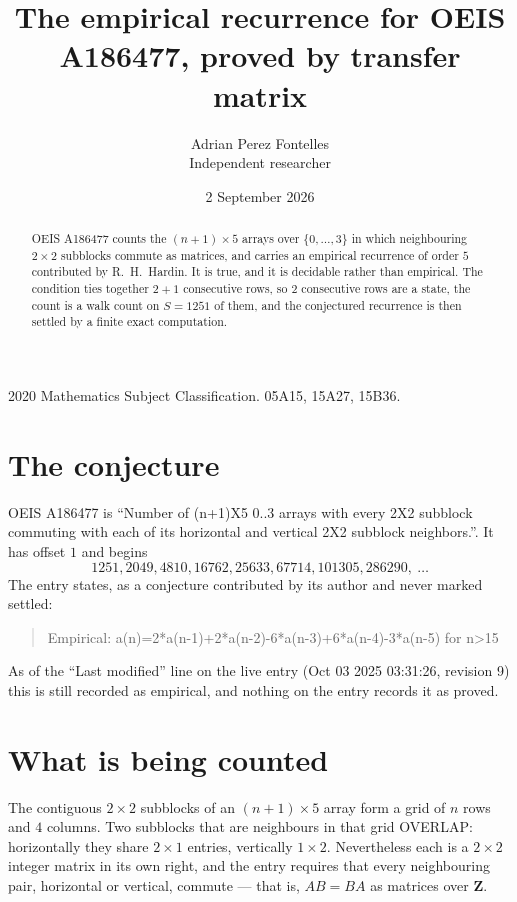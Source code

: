 \documentclass[11pt,a4paper]{article}
\title{The empirical recurrence for OEIS A186477, proved by transfer matrix}
\author{Adrian Perez Fontelles\\ \small Independent researcher}
\date{2 September 2026}
\theoremstyle{plain}
\theoremstyle{definition}
\begin{document}
\maketitle

\begin{abstract}
OEIS A186477 counts the $(n+1)\times5$ arrays over $\{0,\dots,3\}$ in which
neighbouring $2\times2$ subblocks commute as matrices, and carries an empirical recurrence
of order $5$ contributed by R.~H.~Hardin. It is true, and it is decidable rather than
empirical. The condition ties together $2+1$ consecutive rows, so $2$ consecutive rows are
a state, the count is a walk count on $S=1251$ of them, and the conjectured recurrence is then
settled by a finite exact computation.
\end{abstract}

\noindent\small 2020 Mathematics Subject Classification. 05A15, 15A27, 15B36.\normalsize

\section{The conjecture}

OEIS A186477 is ``Number of (n+1)X5 0..3 arrays with every 2X2 subblock commuting with each of its horizontal and vertical 2X2 subblock neighbors.''. It has offset $1$ and begins
\[
1251, 2049, 4810, 16762, 25633, 67714, 101305, 286290,\ \dots
\]
The entry states, as a conjecture contributed by its author and never marked settled:
\begin{quote}
Empirical: a(n)=2*a(n-1)+2*a(n-2)-6*a(n-3)+6*a(n-4)-3*a(n-5) for n>15
\end{quote}
As of the ``Last modified'' line on the live entry (Oct 03 2025 03:31:26, revision 9) this is still
recorded as empirical, and nothing on the entry records it as proved.

\section{What is being counted}

The contiguous $2\times2$ subblocks of an $(n+1)\times5$ array form a grid of $n$
rows and $4$ columns. Two subblocks that are neighbours in that
grid OVERLAP: horizontally they share $2\times1$ entries, vertically
$1\times2$. Nevertheless each is a $2\times2$ integer matrix in its own right, and
the entry requires that every neighbouring pair, horizontal or vertical, commute --- that is,
$AB=BA$ as matrices over $\mathbf{Z}$.
\end{document}
